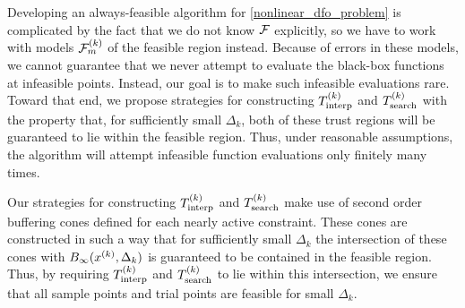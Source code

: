 Developing an always-feasible algorithm for \cref{nonlinear_dfo_problem}  is complicated by the fact that we do not know ${\mathcal F}$ explicitly,  so we have to work with models ${\mathcal F_m^{(k)}}$ of the feasible region instead.   Because of errors in these models,  we cannot guarantee that we never attempt to evaluate the black-box functions at infeasible points.  Instead, our goal is to make such infeasible evaluations rare.    Toward that end,  we propose strategies for constructing ${T_{\text{interp}}^{(k)}}$ and ${T_{\text{search}}^{(k)}}$ with the property that,  for sufficiently small $\Delta_k$,  both of these trust regions will be guaranteed to lie within  the feasible region.   Thus,  under reasonable assumptions, the algorithm will attempt infeasible function evaluations only finitely many times.




%

%


Our strategies for constructing ${T_{\text{interp}}^{(k)}}$ and ${T_{\text{search}}^{(k)}}$ make use of second order buffering cones defined for each nearly active constraint.    These cones are constructed in such a way that for sufficiently small $\Delta_k$ the intersection of these cones with $B_{\infty}(x^{(k)},\Delta_k)$ is guaranteed to be contained in the feasible region.  Thus, by requiring ${T_{\text{interp}}^{(k)}}$ and ${T_{\text{search}}^{(k)}}$ to lie within this intersection, we ensure that all sample points and trial points are feasible for small $\Delta_k$.




